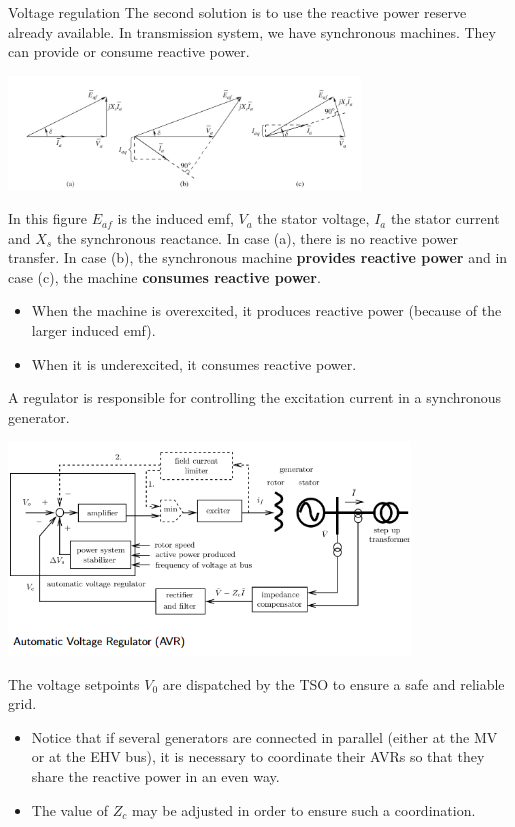 \begin{frame}[allowframebreaks]{Voltage regulation}
The second solution is to use the reactive power reserve already available.
In transmission system, we have synchronous machines. They can provide or consume reactive power.
\begin{center}
\includegraphics[width=0.7\textwidth]{images/SG_EMF.png}
\end{center}
In this figure $E_{af}$ is the induced emf, $V_a$ the stator voltage, $I_a$ the stator current and $X_s$ the synchronous reactance. In case (a), there is no reactive power transfer. In case (b), the synchronous machine \textbf{provides reactive power} and in case (c), the machine \textbf{consumes reactive power}.


\begin{itemize}
    \item When the machine is overexcited, it produces reactive power (because of the larger induced emf).
    \item When it is underexcited, it consumes reactive power.
\end{itemize}
A regulator is responsible for controlling the excitation current in a synchronous generator.
\begin{center}
\includegraphics[width=0.8\textwidth]{images/AVR.png}
\end{center}
The voltage setpoints $V_0$ are dispatched by the TSO to ensure a safe and reliable grid.

\begin{itemize}
    \item Notice that if several generators are connected in parallel (either at the MV or at the EHV bus), it is necessary to coordinate their AVRs so that they share the reactive power in an even way.
    \item The value of $Z_c$ may be adjusted in order to ensure such a coordination.
\end{itemize}
\end{frame}

